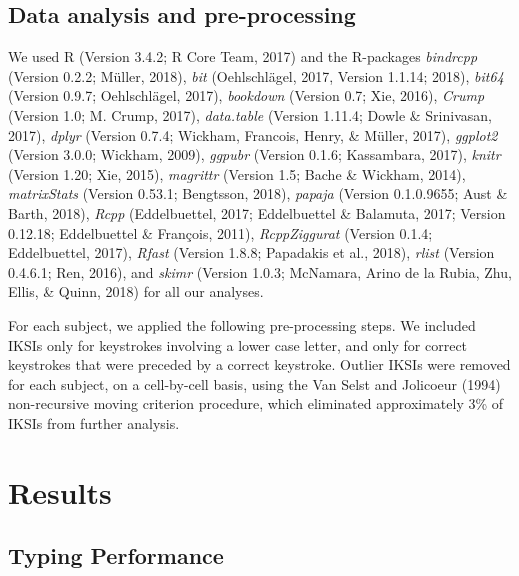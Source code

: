 \documentclass[floatsintext,man]{apa6}
\theoremstyle{definition}
\theoremstyle{definition}
\theoremstyle{definition}
\theoremstyle{remark}
\begin{document}
\subsection{Data analysis and
pre-processing}\label{data-analysis-and-pre-processing}

We used R (Version 3.4.2; R Core Team, 2017) and the R-packages
\emph{bindrcpp} (Version 0.2.2; Müller, 2018), \emph{bit} (Oehlschlägel,
2017, Version 1.1.14; 2018), \emph{bit64} (Version 0.9.7; Oehlschlägel,
2017), \emph{bookdown} (Version 0.7; Xie, 2016), \emph{Crump} (Version
1.0; M. Crump, 2017), \emph{data.table} (Version 1.11.4; Dowle \&
Srinivasan, 2017), \emph{dplyr} (Version 0.7.4; Wickham, Francois,
Henry, \& Müller, 2017), \emph{ggplot2} (Version 3.0.0; Wickham, 2009),
\emph{ggpubr} (Version 0.1.6; Kassambara, 2017), \emph{knitr} (Version
1.20; Xie, 2015), \emph{magrittr} (Version 1.5; Bache \& Wickham, 2014),
\emph{matrixStats} (Version 0.53.1; Bengtsson, 2018), \emph{papaja}
(Version 0.1.0.9655; Aust \& Barth, 2018), \emph{Rcpp} (Eddelbuettel,
2017; Eddelbuettel \& Balamuta, 2017; Version 0.12.18; Eddelbuettel \&
François, 2011), \emph{RcppZiggurat} (Version 0.1.4; Eddelbuettel,
2017), \emph{Rfast} (Version 1.8.8; Papadakis et al., 2018),
\emph{rlist} (Version 0.4.6.1; Ren, 2016), and \emph{skimr} (Version
1.0.3; McNamara, Arino de la Rubia, Zhu, Ellis, \& Quinn, 2018) for all
our analyses.

For each subject, we applied the following pre-processing steps. We
included IKSIs only for keystrokes involving a lower case letter, and
only for correct keystrokes that were preceded by a correct keystroke.
Outlier IKSIs were removed for each subject, on a cell-by-cell basis,
using the Van Selst and Jolicoeur (1994) non-recursive moving criterion
procedure, which eliminated approximately 3\% of IKSIs from further
analysis.

\section{Results}\label{results}

\subsection{Typing Performance}\label{typing-performance}
\end{document}
